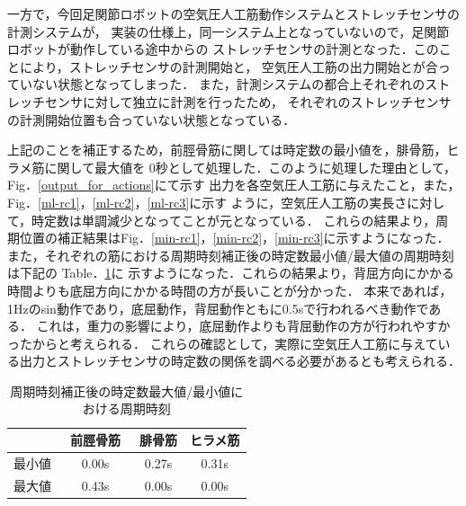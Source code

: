 一方で，今回足関節ロボットの空気圧人工筋動作システムとストレッチセンサの計測システムが，
実装の仕様上，同一システム上となっていないので，足関節ロボットが動作している途中からの
ストレッチセンサの計測となった．このことにより，ストレッチセンサの計測開始と，
空気圧人工筋の出力開始とが合っていない状態となってしまった．
また，計測システムの都合上それぞれのストレッチセンサに対して独立に計測を行ったため，
それぞれのストレッチセンサの計測開始位置も合っていない状態となっている．

上記のことを補正するため，前脛骨筋に関しては時定数の最小値を，腓骨筋，ヒラメ筋に関して最大値を
0秒として処理した．このように処理した理由として，Fig．\ref{output_for_actions}にて示す
出力を各空気圧人工筋に与えたこと，また，Fig．\ref{ml-rc1}，\ref{ml-rc2}，\ref{ml-rc3}に示す
ように，空気圧人工筋の実長さに対して，時定数は単調減少となってことが元となっている．
これらの結果より，周期位置の補正結果はFig．\ref{min-rc1}，\ref{min-rc2}，\ref{min-rc3}に示すようになった．
また，それぞれの筋における周期時刻補正後の時定数最小値/最大値の周期時刻は下記の Table．\ref{min-max}に
示すようになった．これらの結果より，背屈方向にかかる時間よりも底屈方向にかかる時間の方が長いことが分かった．
本来であれば，1Hzのsin動作であり，底屈動作，背屈動作ともに0.5sで行われるべき動作である．
これは，重力の影響により，底屈動作よりも背屈動作の方が行われやすかったからと考えられる．
これらの確認として，実際に空気圧人工筋に与えている出力とストレッチセンサの時定数の関係を調べる必要があるとも考えられる．
\begin{table}[h]
  \begin{center}
    \label{min-max}
    \caption{周期時刻補正後の時定数最大値/最小値における周期時刻}
    \begin{tabular}{|c||c|c|c|}\hline
      & 前脛骨筋　& 腓骨筋 & ヒラメ筋 \\ \hline \hline
      最小値 & 0.00s & 0.27s & 0.31s \\ \hline
      最大値 & 0.43s & 0.00s & 0.00s \\ \hline
    \end{tabular}
  \end{center}
\end{table}

